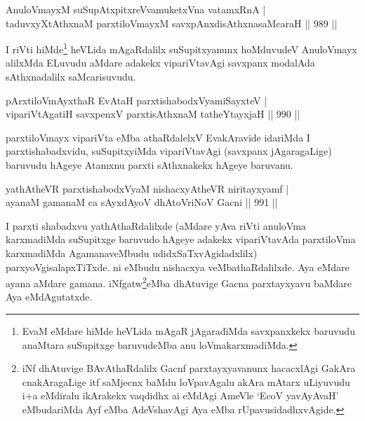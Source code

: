 \begin{shl}
AnuloVmayxM suSupAtxpitxreVvamuketxVna vatamxRnA | \\
taduvxyXtAthxnaM parxtiloVmayxM \footnotemark[2]savxpAnxdisAthxnasaMcaraH \hfill||   989 ||  
\end{shl}

\begin{artha}
I riVti hiMde\footnote[1]{EvaM eMdare hiMde heVLida mAgaR jAgaradiMda savxpanxkekx baruvudu anaMtara suSupitxge baruvudeMba anu loVmakarxmadiMda.} heVLida mAgaRdalilx suSupitxyanunx hoMduvudeV AnuloVmayx alilxMda ELuvudu aMdare adakekx vipariVtavAgi savxpanx modalAda sAthxnadalilx saMcarisuvudu.
\end{artha}


\begin{shl}
pArxtiloVmAyxthaR EvAtaH parxtishabodxV\s yamiSayxteV | \\
vipariVtA\s \s gatiH savxpenxV \footnotemark[3]parxtisAthxnaM tatheYtayxjaH \hfill||  990 ||  
\end{shl}
\begin{artha}
parxtiloVmayx vipariVta eMba athaRdalelxV EvakAravide idariMda I parxtishabadxvidu, suSupitxyiMda vipariVtavAgi (savxpanx jAgaragaLige) baruvudu hAgeye Atamxnu parxti sAthxnakekx hAgeye baruvanu.
\end{artha}


\begin{shl}
yathAtheVR parxtishabodxV\s yaM nishacxyAtheVR niritayxyamf | \\
ayanaM gamanaM ca sAyxdAyoV dhAtoVriNoV Gacni \hfill||  991 ||  
\end{shl}

\begin{artha}
I parxti shabadxvu yathAthaRdalilxde (aMdare yAva riVti anuloVma karxmadiMda suSupitxge baruvudo hAgeye adakekx vipariVtavAda parxtiloVma karxmadiMda AgamanaveMbudu udidxSaTxvAgidadxlilx) parxyoVgisalapxTiTxde. ni eMbudu nishacxya veMbathaRdalilxde. Aya eMdare ayana aMdare gamana. iNfgatw\footnote[1]{iNf dhAtuvige BAvAthaRdalilx Gacnf parxtayxyavanunx hacacxlAgi GakAra cnakAragaLige itf saMjecnx baMdu loVpavAgalu akAra mAtarx uLiyuvudu i+a eMdiralu ikArakekx vaqdidhx ai eMdAgi AmeVle `EcoV yavAyAvaH' eMbudariMda Ayf eMba AdeVshavAgi Aya eMba rUpavusidadhxvAgide.}eMba dhAtuvige Gacna parxtayxyavu baMdare Aya eMdAgutatxde.
\end{artha}

